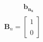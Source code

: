 \documentclass[preview]{standalone}
\begin{document}
\begin{align*}
\begin{array}{c}\begin{matrix}\hspace{1cm} \mathbf{b_{n_x}}\end{matrix} \\  \mathbf{B}_n = \begin{bmatrix} 1 \\ \\0  \end{bmatrix} \end{array}
\end{align*}
\end{document}
